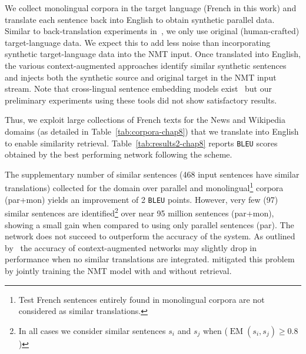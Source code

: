 We collect monolingual corpora in the target language (French in this work) and translate each sentence back into English to obtain synthetic parallel data. Similar to back-translation experiments in~\citet{Sennrich16improving}, we only use original (human-crafted) target-language data. We expect this to add less noise than incorporating synthetic target-language data into the NMT input.
Once translated into English, the various context-augmented approaches identify similar synthetic sentences and injects both the synthetic source and original target in the NMT input stream.
%
Note that cross-lingual sentence embedding models exist~\citep{sabet2019robust,schwenk17learning,Conneau19crosslingual} but our preliminary experiments using these tools did not show satisfactory results.

Thus, we exploit large collections of French texts for the News and Wikipedia domains (as detailed in Table~\ref{tab:corpora-chap8}) that we translate into English to enable similarity retrieval. 
%
Table~\ref{tab:results2-chap8} reports \texttt{BLEU} scores obtained by the best performing network  following the  scheme.

The supplementary number of similar sentences (468 input sentences have similar translations) collected for the  domain over parallel and monolingual\footnote{Test French sentences entirely found in monolingual  corpora are not considered as similar translations.} corpora (par+mon) yields an improvement of 2 \texttt{BLEU} points.
However, very few (97) similar sentences are identified\footnote{In all cases we consider similar sentences $s_i$ and $s_j$ when ($\operatorname{EM}(s_i,s_j) \ge 0.8$)} over near 95 million sentences (par+mon), showing a small gain when compared to using only parallel sentences (par). The network does not succeed to outperform the accuracy of the  system. 
As outlined by~\citet{bulte19neural,xu20boosting} the accuracy of context-augmented networks may slightly drop in performance when no similar translations are integrated. \citet{he21fast} mitigated this problem by jointly training the NMT model with and without retrieval.

